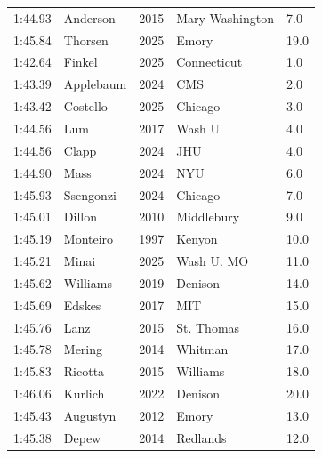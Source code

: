 \begin{table}[H]
\begin{minipage}[t]{0.48\textwidth}
\begin{tabular}{@{}p{1.8cm}p{2.8cm}p{1.2cm}p{1.4cm}p{0.8cm}@{}}
\hline
    1:44.93 & Anderson & 2015 & Mary Washington & 7.0 \\
    1:45.84 & Thorsen & 2025 & Emory & 19.0 \\
    1:42.64 & Finkel & 2025 & Connecticut & 1.0 \\
    1:43.39 & Applebaum & 2024 & CMS & 2.0 \\
    1:43.42 & Costello & 2025 & Chicago & 3.0 \\
    1:44.56 & Lum & 2017 & Wash U & 4.0 \\
    1:44.56 & Clapp & 2024 & JHU & 4.0 \\
    1:44.90 & Mass & 2024 & NYU & 6.0 \\
    1:45.93 & Ssengonzi & 2024 & Chicago & 7.0 \\
    1:45.01 & Dillon & 2010 & Middlebury & 9.0 \\
    1:45.19 & Monteiro & 1997 & Kenyon & 10.0 \\
    1:45.21 & Minai & 2025 & Wash U. MO & 11.0 \\
    1:45.62 & Williams & 2019 & Denison & 14.0 \\
    1:45.69 & Edskes & 2017 & MIT & 15.0 \\
    1:45.76 & Lanz & 2015 & St. Thomas & 16.0 \\
    1:45.78 & Mering & 2014 & Whitman & 17.0 \\
    1:45.83 & Ricotta & 2015 & Williams & 18.0 \\
    1:46.06 & Kurlich & 2022 & Denison & 20.0 \\
    1:45.43 & Augustyn & 2012 & Emory & 13.0 \\
    1:45.38 & Depew & 2014 & Redlands & 12.0 \\
\hline
\end{tabular}
\end{minipage}
\end{table}

